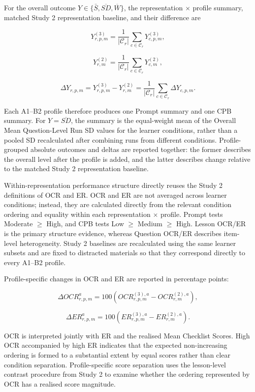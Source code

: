 For the overall outcome $Y\in\{\bar S,\overline{SD},\overline W\}$, the representation $\times$ profile summary, matched Study 2 representation baseline, and their difference are

\[
Y^{(3)}_{r,p,m}
=
\frac{1}{|\mathcal C_r|}
\sum_{c\in\mathcal C_r}
Y^{(3)}_{c,p,m},
\]

\[
Y^{(2)}_{r,m}
=
\frac{1}{|\mathcal C_r|}
\sum_{c\in\mathcal C_r}
Y^{(2)}_{c,m},
\]

\[
\Delta Y_{r,p,m}
=
Y^{(3)}_{r,p,m}
-
Y^{(2)}_{r,m}
=
\frac{1}{|\mathcal C_r|}
\sum_{c\in\mathcal C_r}
\Delta Y_{c,p,m}.
\]

Each A1--B2 profile therefore produces one Prompt summary and one CPB summary. For $Y=\overline{SD}$, the summary is the equal-weight mean of the Overall Mean Question-Level Run SD values for the learner conditions, rather than a pooled SD recalculated after combining runs from different conditions. Profile-grouped absolute outcomes and deltas are reported together: the former describes the overall level after the profile is added, and the latter describes change relative to the matched Study 2 representation baseline.

Within-representation performance structure directly reuses the Study 2 definitions of OCR and ER. OCR and ER are not averaged across learner conditions; instead, they are calculated directly from the relevant condition ordering and equality within each representation $\times$ profile. Prompt tests Moderate $\ge$ High, and CPB tests Low $\ge$ Medium $\ge$ High. Lesson OCR/ER is the primary structure evidence, whereas Question OCR/ER describes item-level heterogeneity. Study 2 baselines are recalculated using the same learner subsets and are fixed to distracted materials so that they correspond directly to every A1--B2 profile.

Profile-specific changes in OCR and ER are reported in percentage points:

\[
\Delta OCR^{a}_{r,p,m}
=
100\left(
OCR^{(3),a}_{r,p,m}
-
OCR^{(2),a}_{r,m}
\right),
\]

\[
\Delta ER^{a}_{r,p,m}
=
100\left(
ER^{(3),a}_{r,p,m}
-
ER^{(2),a}_{r,m}
\right).
\]

OCR is interpreted jointly with ER and the realised Mean Checklist Scores. High OCR accompanied by high ER indicates that the expected non-increasing ordering is formed to a substantial extent by equal scores rather than clear condition separation. Profile-specific score separation uses the lesson-level contrast procedure from Study 2 to examine whether the ordering represented by OCR has a realised score magnitude.


